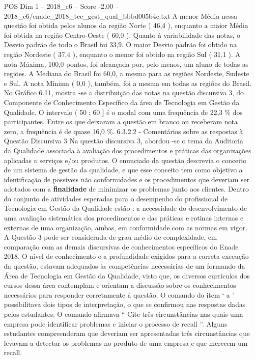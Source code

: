 \begin{textsample}{POS Dim 1 – 2018\_c6 – Score -2.00 – 2018\_c6/enade\_2018\_tec\_gest\_qual\_bbbd005b4c.txt}
A menor Média nessa questão foi obtida pelos alunos da região Norte ( 46,4 ), enquanto a maior Média foi obtida na região Centro-Oeste ( 60,0 ).
Quanto à variabilidade das notas, o Desvio padrão de todo o Brasil foi 33,9.
O maior Desvio padrão foi obtido na região Nordeste ( 37,4 ), enquanto o menor foi obtido na região Sul ( 31,1 ).
A nota Máxima, 100,0 pontos, foi alcançada por, pelo menos, um aluno de todas as regiões.
A Mediana do Brasil foi 60,0, a mesma para as regiões Nordeste, Sudeste e Sul.
A nota Mínima ( 0,0 ), também, foi a mesma em todas as regiões do Brasil.
No Gráfico 6.11, mostra -se a distribuição das notas na questão discursiva 3, do Componente de Conhecimento Específico da área de Tecnologia em Gestão da Qualidade.
O intervalo ( 50 ; 60 ] é o modal com uma frequência de 22,3 \% dos participantes.
Entre os que deixaram a questão em branco ou receberam nota zero, a frequência é de quase 16,0 \%. 6.3.2.2 - Comentários sobre as respostas à Questão Discursiva 3 Na questão discursiva 3, abordou -se o tema da Auditoria da Qualidade associada à avaliação dos procedimentos e práticas das organizações aplicadas a serviços e/ou produtos.
O enunciado da questão descrevia o conceito de um sistema de gestão da qualidade, e que esse conceito tem como objetivo a identificação de possíveis não conformidades e os procedimentos que deveriam ser adotados com a \textbf{finalidade} de minimizar os problemas junto aos clientes.
Dentro do conjunto de atividades esperadas para o desempenho do profissional de Tecnologia em Gestão da Qualidade estão : a necessidade do desenvolvimento de uma avaliação sistemática dos procedimentos e das práticas e rotinas internas e externas de uma organização, ambas, em conformidade com as normas em vigor.
A Questão 3 pode ser considerada de grau médio de complexidade, em comparação com as demais discursivas de conhecimentos específicos do Enade 2018.
O nível de conhecimento e a profundidade exigidos para a correta execução da questão, estavam adequados às competências necessárias de um formando da Área de Tecnologia em Gestão da Qualidade, visto que, os diversos currículos dos cursos dessa área contemplam e orientam a discussão sobre os conhecimentos necessários para responder corretamente à questão.
O comando do item ‘ a ’ possibilitava dois tipos de interpretação, o que se confirmou nas respostas dadas pelos estudantes.
O comando afirmava “ Cite três circunstâncias nas quais uma empresa pode identificar problemas e iniciar o processo de recall ”.
Alguns estudantes compreenderam que deveriam ser apresentadas três circunstâncias que levavam a detectar os problemas no produto de uma empresa e que merecem um recall.

\end{textsample}
